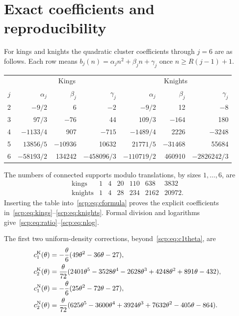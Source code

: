 \documentclass[11pt]{article}
\begin{document}
\section{Exact coefficients and reproducibility}\label{scp:sec:coefficients}
For kings and knights the quadratic cluster coefficients through $j=6$ are as follows. Each row means $b_j(n)=\alpha_jn^2+\beta_jn+\gamma_j$ once $n\ge R(j-1)+1$.
\begin{center}
\begin{tabular}{crrr|rrr}
\toprule
&\multicolumn{3}{c}{Kings}&\multicolumn{3}{c}{Knights}\\
$j$&$\alpha_j$&$\beta_j$&$\gamma_j$&$\alpha_j$&$\beta_j$&$\gamma_j$\\
\midrule
2&$-9/2$&6&$-2$&$-9/2$&12&$-8$\\
3&$97/3$&$-76$&44&$109/3$&$-164$&180\\
4&$-1133/4$&907&$-715$&$-1489/4$&2226&$-3248$\\
5&$13856/5$&$-10936$&10632&$21771/5$&$-31468$&55684\\
6&$-58193/2$&134242&$-458096/3$&$-110719/2$&460910&$-2826242/3$\\
\bottomrule
\end{tabular}
\end{center}
The numbers of connected supports modulo translations, by sizes $1,\ldots,6$, are
\[
\begin{array}{c|rrrrrr}
\text{kings}&1&4&20&110&638&3832\\
\text{knights}&1&4&28&234&2162&20972.
\end{array}
\]
Inserting the table into~\eqref{scp:eq:cformula} proves the explicit coefficients in~\eqref{scp:eq:kings}--\eqref{scp:eq:knights}. Formal division and logarithms give~\eqref{scp:eq:ratio}--\eqref{scp:eq:nlog}.

The first two uniform-density corrections, beyond~\eqref{scp:eq:c1theta}, are
\begin{align*}
 c_1^{\rm K}(\theta)&=-\frac{\theta}{6}(49\theta^2-36\theta-27),\\
 c_2^{\rm K}(\theta)&=\frac{\theta}{72}
 (2401\theta^5-3528\theta^4-2628\theta^3
                    +4248\theta^2+891\theta-432),\\
 c_1^{\rm N}(\theta)&=-\frac{\theta}{6}(25\theta^2-72\theta-27),\\
 c_2^{\rm N}(\theta)&=\frac{\theta}{72}
 (625\theta^5-3600\theta^4+3924\theta^3
                    +7632\theta^2-405\theta-864).
\end{align*}
\end{document}
